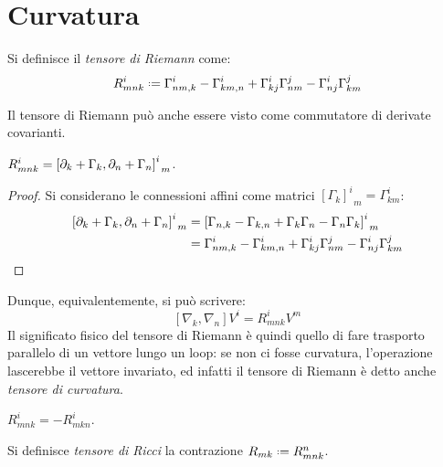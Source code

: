 \section{Curvatura}

\begin{definition}
	Si definisce il \textit{tensore di Riemann} come:
	\begin{equation}
		R^i_{mnk} \defeq \Gamma^i_{nm,k} - \Gamma^i_{km,n} + \Gamma^i_{kj} \Gamma^j_{nm} - \Gamma^i_{nj} \Gamma^j_{km}
		\label{eq:5.31}
	\end{equation}
\end{definition}

Il tensore di Riemann può anche essere visto come commutatore di derivate covarianti.

\begin{proposition}
	$ R^i_{mnk} = \left[ \partial_k + \Gamma_k, \partial_n + \Gamma_n \right]^i_{\,\,\,m} $.
\end{proposition}
\begin{proof}
	Si considerano le connessioni affini come matrici $ [\Gamma_k]^i_{\,\,\,m} = \Gamma^i_{km} $:
	\begin{equation*}
		\begin{split}
			\left[ \partial_k + \Gamma_k, \partial_n + \Gamma_n \right]^i_{\,\,\,m}
			&= \left[ \Gamma_{n,k} - \Gamma_{k,n} + \Gamma_k \Gamma_n - \Gamma_n \Gamma_k \right]^i_{\,\,\,m}\\
			&= \Gamma^i_{nm,k} - \Gamma^i_{km,n} + \Gamma^i_{kj} \Gamma^j_{nm} - \Gamma^i_{nj} \Gamma^j_{km}
		\end{split}
	\end{equation*}

\end{proof}

Dunque, equivalentemente, si può scrivere:
\begin{equation}
	\left[ \nabla_k, \nabla_n \right] V^i = R^i_{mnk} V^m
	\label{eq:5.32}
\end{equation}
Il significato fisico del tensore di Riemann è quindi quello di fare trasporto parallelo di un vettore lungo un loop: se non ci fosse curvatura, l'operazione lascerebbe il vettore invariato, ed infatti il tensore di Riemann è detto anche \textit{tensore di curvatura}.

\begin{proposition}
	$ R^i_{mnk} = - R^i_{mkn} $.
\end{proposition}

\begin{definition}
	Si definisce \textit{tensore di Ricci} la contrazione $ R_{mk} \defeq R^n_{mnk} $.
\end{definition}


